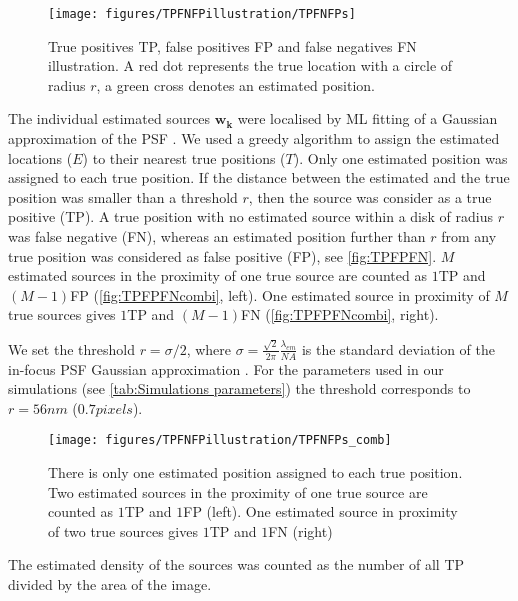 \begin{figure}[!h]
	\centering
	\texttt{[image: figures/TPFNFPillustration/TPFNFPs]}
	\caption{True positives TP, false positives FP and false negatives FN illustration. A red dot represents the true location with a circle of radius $r$, a green cross denotes an estimated position.}
	\label{fig:TPFPFN}
\end{figure}

The individual estimated sources $\bm{w_k}$ were localised by ML fitting of a Gaussian approximation of the PSF \cite{Zhang2007}. We used a greedy algorithm to assign the estimated locations ($E$) to their nearest true positions ($T$). Only one estimated position was assigned to each true position. If the distance between the estimated and the true position was smaller than a threshold $r$, then the source was consider as a true positive (TP). A true position with no estimated source within a disk of radius $r$ was false negative (FN), whereas an estimated position further than $r$ from any true position was considered as false positive (FP), see \autoref{fig:TPFPFN}. $M$ estimated sources in the proximity of one true source are counted as $1$TP and $(M-1)$FP (\autoref{fig:TPFPFNcombi}, left). One estimated source in proximity of $M$ true sources gives $1$TP and $(M-1)$FN (\autoref{fig:TPFPFNcombi}, right).

We set the threshold $r=\sigma/2$, where $\sigma=\frac{\sqrt{2}}{2\pi}\frac{\lambda_{em}}{NA}$ is the standard deviation of the in-focus PSF Gaussian approximation \cite{Zhang2007}. For the parameters used in our simulations (see \autoref{tab:Simulations parameters}) the threshold corresponds to $r=56\unit{nm}$ ($0.7\unit{pixels}$). 

\begin{figure}[!h]
	\centering
	\texttt{[image: figures/TPFNFPillustration/TPFNFPs\_comb]}
	\caption{There is only one estimated position assigned to each true position. Two estimated sources in the proximity of one true source are counted as $1$TP and $1$FP (left). One estimated source in proximity of two true sources gives $1$TP and $1$FN (right)}
	\label{fig:TPFPFNcombi}
\end{figure}

The estimated density of the sources was counted as the number of all TP divided by the area of the image.

